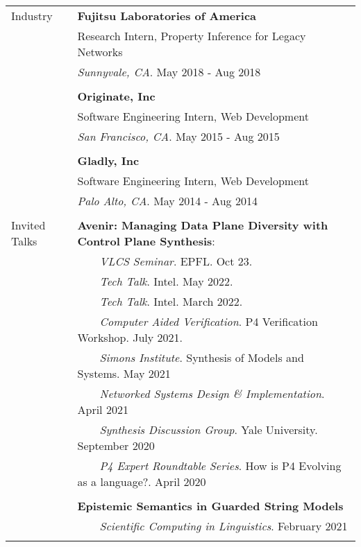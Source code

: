\documentclass[letterpaper,10pt,oneside]{article}
\newcommand{\tabitem}{~~\llap{\textbullet}~~}
\begin{document}
\begin{tabular}{@{} l l }

  \Large{Industry}
  & \textbf{Fujitsu Laboratories of America} \\
  & Research Intern, Property Inference for Legacy Networks \\
  & \textit{Sunnyvale, CA}. May 2018 - Aug 2018 \\
  & \\
  & \textbf{Originate, Inc} \\
  & Software Engineering Intern, Web Development \\
  & \textit{San Francisco, CA}. May 2015 - Aug 2015 \\
  & \\
  & \textbf{Gladly, Inc} \\
  & Software Engineering Intern, Web Development \\
  & \textit{Palo Alto, CA}. May 2014 - Aug 2014 \\ \\

  \Large{Invited Talks}
  & \textbf{Avenir: Managing Data Plane Diversity with Control Plane Synthesis}: \\
      & \tabitem \textit{VLCS Seminar}. EPFL. Oct 23. \\
      & \tabitem \textit{Tech Talk}. Intel. May 2022. \\
      & \tabitem \textit{Tech Talk}. Intel. March 2022. \\
      & \tabitem \textit{Computer Aided Verification}. P4 Verification Workshop. July 2021.\\
      & \tabitem \textit{Simons Institute}. Synthesis of Models and Systems. May 2021\\
      & \tabitem \textit{Networked Systems Design \& Implementation}. April 2021\\
      & \tabitem \textit{Synthesis Discussion Group}. Yale University.  September 2020\\
      & \tabitem \textit{P4 Expert Roundtable Series}. How is P4 Evolving as a language?. April 2020\\
  & \\
  & \textbf{Epistemic Semantics in Guarded String Models} \\
  & \tabitem \textit{Scientific Computing in Linguistics}. February 2021\\
  & \\


\end{tabular}
\end{document}

